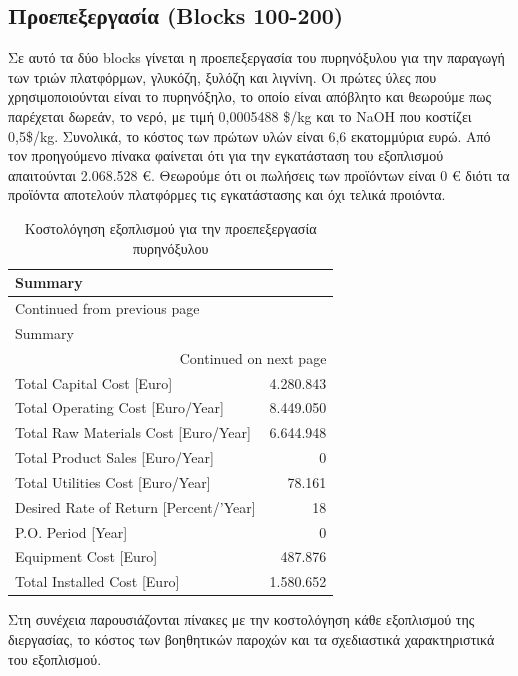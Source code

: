\documentclass[11pt]{article}
\begin{document}
\subsection{Προεπεξεργασία (Blocks 100-200)}
\label{sec:orgcaf74f4}
Σε αυτό τα δύο blocks γίνεται η προεπεξεργασία του πυρηνόξυλου για την παραγωγή των τριών πλατφόρμων, γλυκόζη, ξυλόζη και λιγνίνη. Οι πρώτες ύλες που χρησιμοποιούνται είναι το
πυρηνόξηλο, το οποίο είναι απόβλητο και θεωρούμε πως παρέχεται δωρεάν, το νερό, με τιμή
0,0005488 \$/kg και το NaOH που κοστίζει 0,5\$/kg. Συνολικά, το κόστος των
πρώτων υλών είναι 6,6 εκατομμύρια ευρώ. Από τον προηγούμενο πίνακα φαίνεται ότι
για την εγκατάσταση του εξοπλισμού απαιτούνται 2.068.528 €. Θεωρούμε ότι
οι πωλήσεις των προϊόντων είναι 0 € διότι τα προϊόντα αποτελούν πλατφόρμες τις εγκατάστασης και όχι τελικά προιόντα.

\begin{longtable}{lr}
\caption{Κοστολόγηση εξοπλισμού για την προεπεξεργασία πυρηνόξυλου}
\\
Summary & \\
\hline
\endfirsthead
\multicolumn{2}{l}{Continued from previous page} \\
\hline

Summary &  \\

\hline
\endhead
\hline\multicolumn{2}{r}{Continued on next page} \\
\endfoot
\endlastfoot
\hline
Total Capital Cost [Euro] & 4.280.843\\
Total Operating Cost [Euro/Year] & 8.449.050\\
Total Raw Materials Cost [Euro/Year] & 6.644.948\\
Total Product Sales [Euro/Year] & 0\\
Total Utilities Cost [Euro/Year] & 78.161\\
Desired Rate of Return [Percent/'Year] & 18\\
P.O. Period [Year] & 0\\
Equipment Cost [Euro] & 487.876\\
Total Installed Cost [Euro] & 1.580.652\\
\end{longtable}

Στη συνέχεια παρουσιάζονται πίνακες με την κοστολόγηση κάθε εξοπλισμού
της διεργασίας, το κόστος των βοηθητικών παροχών και τα σχεδιαστικά
χαρακτηριστικά του εξοπλισμού.
\end{document}
